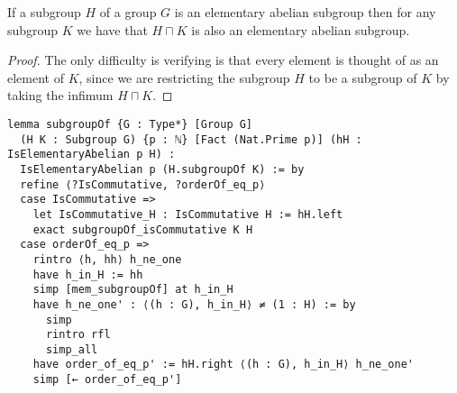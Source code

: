 \begin{corollary}
  \label{IsElementaryAbelian.subgroupOf}
  \leanok
  If a subgroup $H$ of a group $G$ is an elementary abelian subgroup then 
  for any subgroup $K$ we have that $H \sqcap K$ is also an elementary abelian subgroup.
\end{corollary}
\begin{proof}
\leanok
The only difficulty is verifying is that every element is thought of as an element of $K$, since we are
restricting the subgroup $H$ to be a subgroup of $K$ by taking the infimum $H \sqcap K$. 
\end{proof}
\begin{footnotesize}
\begin{verbatim}
lemma subgroupOf {G : Type*} [Group G]
  (H K : Subgroup G) {p : ℕ} [Fact (Nat.Prime p)] (hH : IsElementaryAbelian p H) :
  IsElementaryAbelian p (H.subgroupOf K) := by
  refine ⟨?IsCommutative, ?orderOf_eq_p⟩
  case IsCommutative =>
    let IsCommutative_H : IsCommutative H := hH.left
    exact subgroupOf_isCommutative K H
  case orderOf_eq_p =>
    rintro ⟨h, hh⟩ h_ne_one
    have h_in_H := hh
    simp [mem_subgroupOf] at h_in_H
    have h_ne_one' : ⟨(h : G), h_in_H⟩ ≠ (1 : H) := by
      simp
      rintro rfl
      simp_all
    have order_of_eq_p' := hH.right ⟨(h : G), h_in_H⟩ h_ne_one'
    simp [← order_of_eq_p']
\end{verbatim}
\end{footnotesize}


